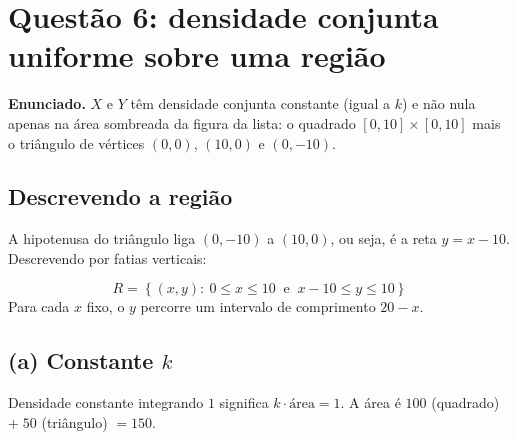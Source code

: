 \documentclass[11pt,a4paper]{article}
\begin{document}
\clearpage
\section{Questão 6: densidade conjunta uniforme sobre uma região}

\textbf{Enunciado.} $X$ e $Y$ têm densidade conjunta constante (igual a $k$) e não
nula apenas na área sombreada da figura da lista: o quadrado $[0,10]\times[0,10]$
mais o triângulo de vértices $(0,0)$, $(10,0)$ e $(0,-10)$.

\subsection*{Descrevendo a região}

A hipotenusa do triângulo liga $(0,-10)$ a $(10,0)$, ou seja, é a reta $y=x-10$.
Descrevendo por fatias verticais:
\begin{resp}
\[
R=\left\{(x,y):\ 0\le x\le 10 \ \text{ e }\ x-10\le y\le 10\right\}
\]
Para cada $x$ fixo, o $y$ percorre um intervalo de comprimento $20-x$.
\end{resp}

\begin{center}
\end{center}

\subsection*{(a) Constante $k$}

Densidade constante integrando $1$ significa $k\cdot\text{área}=1$. A área é
$100$ (quadrado) $+\;50$ (triângulo) $=150$.
\end{document}
